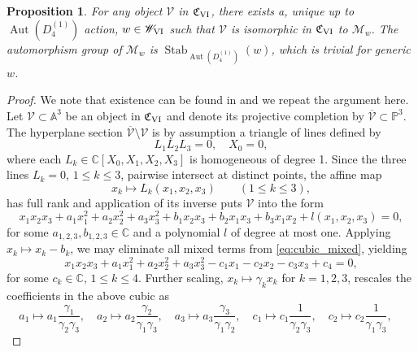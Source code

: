 \documentclass[a4paper,reqno]{amsart}
\numberwithin{equation}{section}
\DeclareMathOperator{\Aut}{Aut}
\newtheorem{proposition}[theorem]{Proposition}
\numberwithin{equation}{section}
\begin{document}
\begin{proposition} \label{prop:oblomkov}
   For any object $\mathcal{V}$ in $\mathfrak{C}_{\rm VI}$, there exists a, unique up to $\operatorname{Aut}(D_4^{(1)})$ action, $w\in \mathscr{W}_{\rm VI}$ such that $\mathcal{V}$ is isomorphic in $ \mathfrak{C}_{\rm VI}$ to $\mathcal{M}_w$. 
   The automorphism group of $\mathcal{M}_w$ is $\operatorname{Stab}_{\Aut(D_4^{(1)})}\left(w\right)$, which is trivial for generic $w$.
\end{proposition}
\begin{proof}
We note that existence can be found in \cite{oblomkov} and we repeat the argument here.
Let $\mathcal{V}\subset \mathbb{A}^3$ be an object in $\mathfrak{C}_{\rm VI}$ and denote its projective completion by $\overline{\mathcal{V}} \subset \mathbb{P}^3$. 
The hyperplane section $\overline{\mathcal{V}}\setminus \mathcal{V}$ is by assumption a triangle of lines defined by
\begin{equation*}
    L_1 L_2 L_3=0,\quad X_0=0,
\end{equation*}
where each $L_k\in \mathbb{C}[X_0,X_1,X_2,X_3]$ is homogeneous of degree 1. Since the three lines $L_k=0$, $1\leq k\leq 3$, pairwise intersect at  distinct points, the affine map
\begin{equation*}
 x_k\mapsto L_k(x_1,x_2,x_3)\qquad (1\leq k\leq 3),   
\end{equation*}
has full rank and application of its inverse puts $\mathcal{V}$ into the form
\begin{equation}\label{eq:cubic_mixed}
    x_1x_2x_3+a_1 x_1^2+a_2 x_2^2+a_3 x_3^2+b_1x_2x_3+b_2x_1x_3+b_3x_1x_2+l(x_1,x_2,x_3)=0,
\end{equation}
for some $a_{1,2,3},b_{1,2,3}\in\mathbb{C}$ and a  polynomial $l$ of degree at most one. Applying $x_k\mapsto x_k-b_k$, we may eliminate all mixed terms from \eqref{eq:cubic_mixed}, yielding
\begin{equation*}
    x_1x_2x_3+a_1 x_1^2+a_2 x_2^2+a_3 x_3^2-c_1 x_1-c_2 x_2-c_3 x_3+c_4=0,
\end{equation*}
for some $c_k\in\mathbb{C}$, $1\leq k\leq 4$.
Further scaling, 
$x_k\mapsto \gamma_k x_k$ for $k=1,2,3$, rescales the coefficients in the above cubic as
\begin{equation*}
    a_1\mapsto a_1 \frac{\gamma_1}{\gamma_2\gamma_3},\quad 
    a_2\mapsto a_2 \frac{\gamma_2}{\gamma_1\gamma_3},\quad
    a_3\mapsto a_3 \frac{\gamma_3}{\gamma_1\gamma_2},\quad
   c_1\mapsto c_1 \frac{1}{\gamma_2\gamma_3},\quad 
    c_2\mapsto c_2 \frac{1}{\gamma_1\gamma_3},\quad

\end{equation*}
\end{proof}
\end{document}
